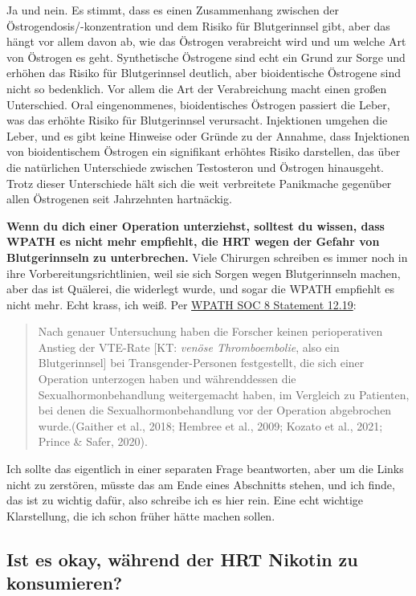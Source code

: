 \documentclass{article}
\begin{document}
{{{Ja und nein. Es stimmt, dass es einen Zusammenhang zwischen der Östrogendosis/-konzentration und dem Risiko für Blutgerinnsel gibt, aber das hängt vor allem davon ab, wie das Östrogen verabreicht wird und um welche Art von Östrogen es geht. Synthetische Östrogene sind echt ein Grund zur Sorge und erhöhen das Risiko für Blutgerinnsel deutlich, aber bioidentische Östrogene sind nicht so bedenklich. Vor allem die Art der Verabreichung macht einen großen Unterschied. Oral eingenommenes, bioidentisches Östrogen passiert die Leber, was das erhöhte Risiko für Blutgerinnsel verursacht. Injektionen umgehen die Leber, und es gibt keine Hinweise oder Gründe zu der Annahme, dass Injektionen von bioidentischem Östrogen ein signifikant erhöhtes Risiko darstellen, das über die natürlichen Unterschiede zwischen Testosteron und Östrogen hinausgeht. Trotz dieser Unterschiede hält sich die weit verbreitete Panikmache gegenüber allen Östrogenen seit Jahrzehnten hartnäckig.

\textbf{Wenn du dich einer Operation unterziehst, solltest du wissen, dass WPATH es nicht mehr empfiehlt, die HRT wegen der Gefahr von Blutgerinnseln zu unterbrechen.} Viele Chirurgen schreiben es immer noch in ihre Vorbereitungsrichtlinien, weil sie sich Sorgen wegen Blutgerinnseln machen, aber das ist Quälerei, die widerlegt wurde, und sogar die WPATH empfiehlt es nicht mehr. Echt krass, ich weiß. Per \href{https://www.tandfonline.com/doi/pdf/10.1080/26895269.2022.2100644}{WPATH SOC 8 Statement 12.19}: \blockquote{Nach genauer Untersuchung haben die Forscher keinen perioperativen Anstieg der VTE-Rate [KT: \textit{venöse Thromboembolie}, also ein Blutgerinnsel] bei Transgender-Personen festgestellt, die sich einer Operation unterzogen haben und währenddessen die Sexualhormonbehandlung weitergemacht haben, im Vergleich zu Patienten, bei denen die Sexualhormonbehandlung vor der Operation abgebrochen wurde.(Gaither et al., 2018; Hembree et al., 2009; Kozato et al., 2021; Prince \& Safer, 2020).} Ich sollte das eigentlich in einer separaten Frage beantworten, aber um die Links nicht zu zerstören, müsste das am Ende eines Abschnitts stehen, und ich finde, das ist zu wichtig dafür, also schreibe ich es hier rein. Eine echt wichtige Klarstellung, die ich schon früher hätte machen sollen.

\subsection{Ist es okay, während der HRT Nikotin zu konsumieren?}\label{11-2}

}}}
\end{document}
